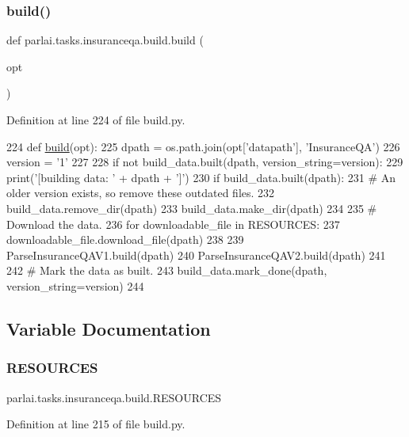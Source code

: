\subsubsection{\texorpdfstring{build()}{build()}}
{\footnotesize\ttfamily def parlai.\+tasks.\+insuranceqa.\+build.\+build (\begin{DoxyParamCaption}\item[{}]{opt }\end{DoxyParamCaption})}



Definition at line 224 of file build.\+py.


\begin{DoxyCode}
224 \textcolor{keyword}{def }\hyperlink{namespacedialog__babi__feedback_1_1build_a7a9d289f7493a5ded13c4b7f071b6184}{build}(opt):
225     dpath = os.path.join(opt[\textcolor{stringliteral}{'datapath'}], \textcolor{stringliteral}{'InsuranceQA'})
226     version = \textcolor{stringliteral}{'1'}
227 
228     \textcolor{keywordflow}{if} \textcolor{keywordflow}{not} build\_data.built(dpath, version\_string=version):
229         print(\textcolor{stringliteral}{'[building data: '} + dpath + \textcolor{stringliteral}{']'})
230         \textcolor{keywordflow}{if} build\_data.built(dpath):
231             \textcolor{comment}{# An older version exists, so remove these outdated files.}
232             build\_data.remove\_dir(dpath)
233         build\_data.make\_dir(dpath)
234 
235         \textcolor{comment}{# Download the data.}
236         \textcolor{keywordflow}{for} downloadable\_file \textcolor{keywordflow}{in} RESOURCES:
237             downloadable\_file.download\_file(dpath)
238 
239         ParseInsuranceQAV1.build(dpath)
240         ParseInsuranceQAV2.build(dpath)
241 
242         \textcolor{comment}{# Mark the data as built.}
243         build\_data.mark\_done(dpath, version\_string=version)
244 \end{DoxyCode}


\subsection{Variable Documentation}
\mbox{\label{namespaceparlai_1_1tasks_1_1insuranceqa_1_1build_aded34e650b79ad5271e4685269ba6051}} 
\subsubsection{\texorpdfstring{R\+E\+S\+O\+U\+R\+C\+ES}{RESOURCES}}
{\footnotesize\ttfamily parlai.\+tasks.\+insuranceqa.\+build.\+R\+E\+S\+O\+U\+R\+C\+ES}



Definition at line 215 of file build.\+py.


